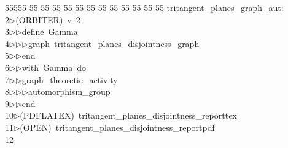 %
%
\begin{tabbing}
55555 \= 55 \= 55 \= 55 \= 55 \= 55 \= 55 \= 55 \= 55 \= 55 \= 55 \= 55 \= 55 \= \>tritangent\_planes\_graph\_aut:\\[0pt]
2\>$\triangleright$\>(ORBITER)\ v\ 2\ \\[0pt]
3\>$\triangleright$\>$\triangleright$\>define\ Gamma\ \\[0pt]
4\>$\triangleright$\>$\triangleright$\>$\triangleright$\>graph\ tritangent\_planes\_disjointness\_graph\ \\[0pt]
5\>$\triangleright$\>$\triangleright$\>end\ \\[0pt]
6\>$\triangleright$\>$\triangleright$\>with\ Gamma\ do\ \\[0pt]
7\>$\triangleright$\>$\triangleright$\>graph\_theoretic\_activity\ \\[0pt]
8\>$\triangleright$\>$\triangleright$\>$\triangleright$\>automorphism\_group\ \\[0pt]
9\>$\triangleright$\>$\triangleright$\>end\ \\[0pt]
10\>$\triangleright$\>(PDFLATEX)\ tritangent\_planes\_disjointness\_reporttex\\[0pt]
11\>$\triangleright$\>(OPEN)\ tritangent\_planes\_disjointness\_reportpdf\\[0pt]
12\>\end{tabbing}
